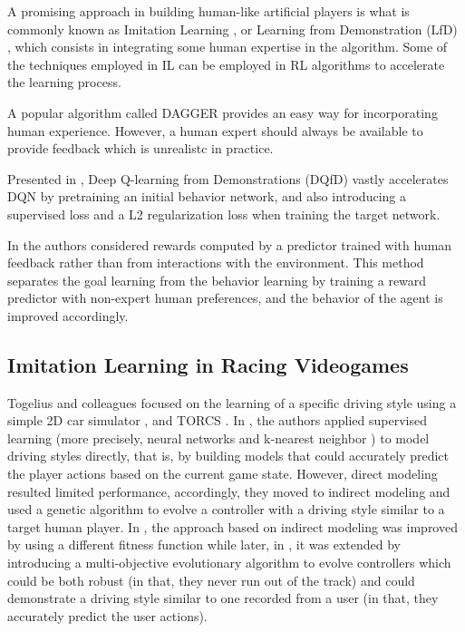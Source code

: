 A promising approach in building human-like artificial players is what is commonly known as Imitation Learning \cite{imit1, imit2, il}, or Learning from Demonstration (LfD) \cite{lfd}, which consists in integrating some human expertise in the algorithm.
Some of the techniques employed in IL can be employed in RL algorithms to accelerate the learning process.


A popular algorithm called DAGGER \cite{dagger} provides an easy way for incorporating human experience. However, a human expert should always be available to provide feedback which is unrealistc in practice. 

Presented in \cite{dqlfd}, Deep Q-learning from Demonstrations (DQfD) vastly accelerates DQN by pretraining an initial behavior network, and also introducing a supervised loss and a L2 regularization loss when training the target network.

In \cite{drlhp} the authors considered rewards computed by a predictor trained with human feedback rather than from  interactions with the environment. This method separates the goal learning from the behavior learning by training a reward predictor with non-expert human preferences, and the behavior of the agent is improved accordingly.

\subsection{Imitation Learning in Racing Videogames}

Togelius and colleagues focused on the learning of a specific driving style using a simple 2D car simulator \cite{imit3}, \cite{imit4} and TORCS \cite{imit5}. In \cite{imit3}, the authors applied supervised learning (more precisely, neural networks and k-nearest neighbor \cite{knn}) to model driving styles directly, that is, by building models that could accurately predict the player actions based on the current game state. However, direct modeling resulted limited performance, accordingly, they moved to indirect modeling and used a genetic algorithm to evolve a controller with a driving style similar to a target human player. In \cite{imit4}, the approach based on indirect modeling was improved by using a different fitness function while later, in \cite{imit5}, it was extended by introducing a multi-objective evolutionary algorithm to evolve controllers which could be both robust (in that, they never run out of the track) and could demonstrate a driving style similar to one recorded from a user (in that, they accurately predict the user actions).



